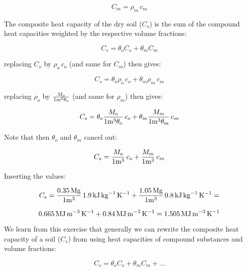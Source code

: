 \documentclass[11pt]{article}
\begin{document}
\begin{enumerate}
\begin{displaymath} 
C_m = \rho_m \,c_m
\end{displaymath}

The composite heat capacity of the dry soil ($C_s$) is the sum of the compound heat capacities weighted by the respective volume fractions:

\begin{displaymath} 
C_s = \theta_o C_o  + \theta_m C_m
\end{displaymath}

replacing $C_o$ by $\rho_o \,c_o$ (and same for $C_m$) then gives:

\begin{displaymath} 
C_s = \theta_o \rho_o \,c_o  + \theta_m \rho_m \,c_m
\end{displaymath}

replacing $\rho_o$ by $\frac{M_o}{1\rm{m}^{3} \theta_o}$ (and same for $\rho_m$) then gives:

\begin{displaymath} 
C_s = \theta_o \frac{M_o}{1\rm{m}^{3} \theta_o} \,c_o  + \theta_m \frac{M_m}{1\rm{m}^{3}  \theta_m} \,c_m
\end{displaymath}

Note that then $\theta_o$ and $\theta_m$ cancel out:

\begin{displaymath} 
C_s =  \frac{M_o}{1\rm{m}^{3}} \,c_o  + \frac{M_m}{1\rm{m}^{3}} \,c_m
\end{displaymath}

Inserting the values:

\begin{displaymath} 
C_s =  \frac{ 0.35\,\rm{Mg}}{1\rm{m}^{3}} \, 1.9\, \rm{kJ}\,\rm{kg}^{-1}\,\rm{K}^{-1}  + \frac{1.05 \,\rm{Mg}}{1\rm{m}^{3}} \,0.8 \, \rm{kJ}\,\rm{kg}^{-1}\,\rm{K}^{-1} = 
\end{displaymath}

\begin{displaymath}
0.665 \, \rm{MJ}\,\rm{m}^{-3}\,\rm{K}^{-1} + 0.84 \, \rm{MJ}\,\rm{m}^{-3}\,\rm{K}^{-1} = 1.505 \, \rm{MJ}\,\rm{m}^{-3}\,\rm{K}^{-1}
\end{displaymath}

We learn from this exercise that generally we can rewrite the composite heat capacity of a soil ($C_s$) from using heat capacities of compound substances and volume fractions:

\begin{displaymath} 
C_s = \theta_o C_o  + \theta_m C_m + ...
\end{displaymath}


\end{enumerate}
\end{document}
